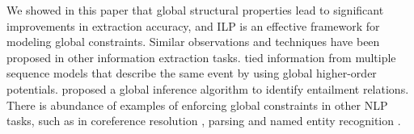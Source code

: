 
 
We showed in this paper that global structural properties lead to significant improvements in extraction accuracy, and ILP is an effective framework for modeling global constraints. Similar observations and techniques have been proposed in other information extraction tasks. 
 tied information from multiple sequence models that describe the same event by using global higher-order potentials. 
 proposed a global inference algorithm to identify entailment relations.  
There is abundance of examples of enforcing global constraints in other NLP tasks, such as in coreference resolution \cite{Finkel08}, parsing \cite{Rush12} and named entity recognition \cite{Wang13}.
